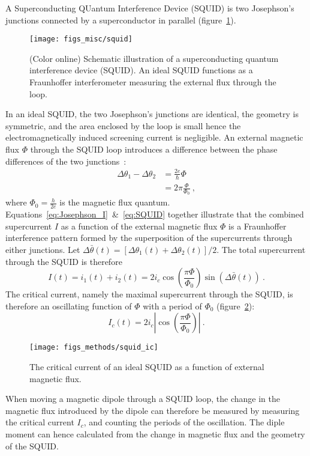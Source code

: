 A Superconducting QUantum Interference Device (SQUID) is two Josephson's junctions connected by a superconductor in parallel (figure~\ref{fig:squid}). %
\begin{figure}[ht]%
	\centering%
    \texttt{[image: figs\_misc/squid]}%
    \caption[Superconducting quantum interference device]{\label{fig:squid}(Color online) Schematic illustration of a superconducting quantum interference device (SQUID). An ideal SQUID functions as a Fraunhoffer interferometer measuring the external flux through the loop.}%
\end{figure}%
%
In an ideal SQUID, the two Josephson's junctions are identical, the geometry is symmetric, and the area enclosed by the loop is small hence the electromagnetically induced screening current is negligible. An external magnetic flux $\Phi$ through the SQUID loop introduces a difference between the phase differences of the two junctions~\cite{Annett}:%
\begin{align}
    \Delta\theta_1 - \Delta\theta_2 &= \frac{2e}{\hbar}\Phi\nonumber\\
        &= 2\pi\frac{\Phi}{\Phi_0}~,\label{eq:SQUID}
\end{align}%
where $\Phi_0 = \frac{h}{2e}$ is the magnetic flux quantum. Equations~\ref{eq:Josephson_I}~\&~\ref{eq:SQUID} together illustrate that the combined supercurrent $I$ as a function of the external magnetic flux $\Phi$ is a Fraunhoffer interference pattern formed by the superposition of the supercurrents through either junctions. Let $\Delta\bar{\theta}(t) = \left[\Delta\theta_1(t) + \Delta\theta_2(t)\right] / 2$. The total supercurrent through the SQUID is therefore%
\begin{equation}
    I(t) = i_1(t) + i_2(t) = 2i_c\cos\left(\frac{\pi\Phi}{\Phi_0}\right)\sin\left(\Delta\bar{\theta}(t)\right)~.
\end{equation}%
The critical current, namely the maximal supercurrent through the SQUID, is therefore an oscillating function of $\Phi$ with a period of $\Phi_0$ (figure~\ref{fig:squid_ic}):%
\begin{equation}
    I_{c}(t) = 2i_c\left|\cos\left(\frac{\pi\Phi}{\Phi_0}\right)\right|~.
\end{equation}%
\begin{figure}[ht]%
	\centering%
    \texttt{[image: figs\_methods/squid\_ic]}%
    \caption[SQUID critical current as a function of magnetic flux]{\label{fig:squid_ic}The critical current of an ideal SQUID as a function of external magnetic flux.}%
\end{figure}%
%
When moving a magnetic dipole through a SQUID loop, the change in the magnetic flux introduced by the dipole can therefore be measured by measuring the critical current $I_c$, and counting the periods of the oscillation. The diple moment can hence calculated from the change in magnetic flux and the geometry of the SQUID.

